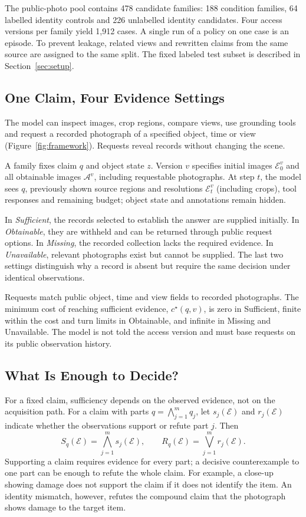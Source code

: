 \documentclass[10pt,twocolumn,letterpaper]{article}
\begin{document}
The public-photo pool contains 478 candidate families: 188 condition families, 64 labelled identity controls and 226 unlabelled identity candidates.
Four access versions per family yield 1,912 cases.
A single run of a policy on one case is an episode.
To prevent leakage, related views and rewritten claims from the same source are assigned to the same split.
The fixed labeled test subset is described in Section~\ref{sec:setup}.

\subsection{One Claim, Four Evidence Settings}
The model can inspect images, crop regions, compare views, use grounding tools and request a recorded photograph of a specified object, time or view (Figure~\ref{fig:framework}).
Requests reveal records without changing the scene.

A family fixes claim \(q\) and object state \(z\).
Version \(v\) specifies initial images \(\mathcal{E}_0^v\) and all obtainable images \(\mathcal{A}^v\), including requestable photographs.
At step \(t\), the model sees \(q\), previously shown source regions and resolutions \(\mathcal{E}_t^v\) (including crops), tool responses and remaining budget; object state and annotations remain hidden.

In \emph{Sufficient}, the records selected to establish the answer are supplied initially.
In \emph{Obtainable}, they are withheld and can be returned through public request options.
In \emph{Missing}, the recorded collection lacks the required evidence.
In \emph{Unavailable}, relevant photographs exist but cannot be supplied.
The last two settings distinguish why a record is absent but require the same decision under identical observations.

Requests match public object, time and view fields to recorded photographs.
The minimum cost of reaching sufficient evidence, \(c^\star(q,v)\), is zero in Sufficient, finite within the cost and turn limits in Obtainable, and infinite in Missing and Unavailable.
The model is not told the access version and must base requests on its public observation history.

\subsection{What Is Enough to Decide?}
For a fixed claim, sufficiency depends on the observed evidence, not on the acquisition path.
For a claim with parts \(q=\bigwedge_{j=1}^{m}q_j\), let \(s_j(\mathcal{E})\) and \(r_j(\mathcal{E})\) indicate whether the observations support or refute part \(j\).
Then
\begin{equation}
S_q(\mathcal{E})=\bigwedge_{j=1}^{m}s_j(\mathcal{E}),
\qquad
R_q(\mathcal{E})=\bigvee_{j=1}^{m}r_j(\mathcal{E}).
\label{eq:sufficiency}
\end{equation}
Supporting a claim requires evidence for every part; a decisive counterexample to one part can be enough to refute the whole claim.
For example, a close-up showing damage does not support the claim if it does not identify the item.
An identity mismatch, however, refutes the compound claim that the photograph shows damage to the target item.
\end{document}
